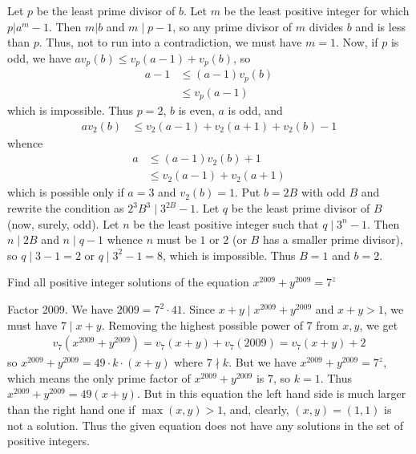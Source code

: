     \begin{solution}
        Let $p$ be the least prime divisor of $b$. Let $m$ be the least positive integer for which $p|a^m-1$. Then $m|b$ and $m\mid p-1$, so any prime divisor of $m$ divides $b$ and is less than $p$. Thus, not to run into a contradiction, we must have $m=1$. Now, if $p$ is odd, we have $av_p(b)\le v_p(a-1)+v_p(b)$, so
        	\begin{align*}
	        	a-1
	        		& \le (a-1)v_p(b)\\
	        		& \le v_p(a-1)
        	\end{align*}
        which is impossible. Thus $p=2$, $b$ is even, $a$ is odd, and
        	\begin{align*}
        		av_2(b)
        			& \le v_2(a-1)+v_2(a+1)+v_2(b)-1
        	\end{align*}
        whence
        	\begin{align*}
        		a
        			& \le (a-1)v_2(b)+1\\
        			& \le v_2(a-1)+v_2(a+1)
        	\end{align*}
        which is possible only if $a=3$ and $v_2(b)=1$. Put $b=2B$ with odd $B$ and rewrite the condition as $2^3B^3\mid 3^{2B}-1$. Let $q$ be the least prime divisor of $B$ (now, surely, odd). Let $n$ be the least positive integer such that $q\mid 3^n-1$. Then $n\mid 2B$ and $n\mid q-1$ whence $n$ must be $1$ or $2$ (or $B$ has a smaller prime divisor), so $q\mid 3-1=2$ or $q\mid 3^2-1=8$, which is impossible. Thus $B=1$ and $b=2$.
    \end{solution}

    \begin{problem}
        Find all positive integer solutions of the equation $ x^{2009} + y^{2009} = 7^z$
    \end{problem}

    \begin{solution}
        Factor 2009. We have $2009 = 7^2\cdot 41$. Since $x+y\mid x^{2009}+y^{2009}$ and $x+y>1$, we must have $7 \mid x+ y$. Removing the highest possible power of $7$ from $x, y$, we get
        	\begin{align*}
        		v_7(x^{2009} + y^{2009}) = v_7(x + y)+ v_7(2009) = v_7(x +y) +2
        	\end{align*}
        so $x^{2009} + y^{2009} = 49\cdot k\cdot (x + y)$ where $7\nmid k$. But we have $x^{2009} + y^{2009} = 7^z$, which means the only prime factor of $x^{2009} + y^{2009}$ is $7$, so $k=1$. Thus $x^{2009} + y^{2009} = 49(x + y)$.  But in this equation the left hand side is much larger than the right hand one if $\max(x, y) > 1$, and, clearly, $(x, y) = (1, 1)$ is not a solution. Thus the given equation does not have any solutions in the set of positive integers.
    \end{solution}
